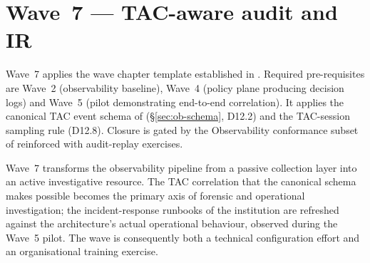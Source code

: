 
\chapter{Wave~7 --- TAC-aware audit and IR}
\label{ch:wave7-audit-ir}

\begin{caveatbox}[Dependencies]
\noindent Wave~7 applies the wave chapter template established in
. Required pre-requisites are
Wave~2 (observability baseline), Wave~4 (policy plane producing
decision logs) and Wave~5 (pilot demonstrating end-to-end
correlation). It applies the canonical TAC event schema of
 (\S\ref{sec:ob-schema}, D12.2) and
the TAC-session sampling rule (D12.8). Closure is gated by the
Observability conformance subset of 
reinforced with audit-replay exercises.
\end{caveatbox}

Wave~7 transforms the observability pipeline from a passive
collection layer into an active investigative resource. The TAC
correlation that the canonical schema makes possible becomes the
primary axis of forensic and operational investigation; the
incident-response runbooks of the institution are refreshed against
the architecture's actual operational behaviour, observed during
the Wave~5 pilot. The wave is consequently both a technical
configuration effort and an organisational training exercise.

